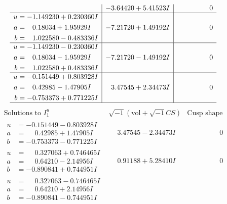 \documentclass[1p]{elsarticle_modified}
\theoremstyle{definition}
\newcommand{\I}{\sqrt{-1}}
\begin{document}
$$\begin{array}{c|c|c}
 & -3.64420 + 5.41523 I & \phantom{-0.000000 } 0 \\ \hline\begin{aligned}
u &= -1.149230 + 0.230360 I \\
a &= \phantom{-}0.18034 + 1.95929 I \\
b &= \phantom{-}1.022580 - 0.483336 I\end{aligned}
 & -7.21720 + 1.49192 I & \phantom{-0.000000 } 0 \\ \hline\begin{aligned}
u &= -1.149230 - 0.230360 I \\
a &= \phantom{-}0.18034 - 1.95929 I \\
b &= \phantom{-}1.022580 + 0.483336 I\end{aligned}
 & -7.21720 - 1.49192 I & \phantom{-0.000000 } 0 \\ \hline\begin{aligned}
u &= -0.151449 + 0.803928 I \\
a &= \phantom{-}0.42985 - 1.47905 I \\
b &= -0.753373 + 0.771225 I\end{aligned}
 & \phantom{-}3.47545 + 2.34473 I & \phantom{-0.000000 } 0\\
 \hline 
 \end{array}$$\newpage$$\begin{array}{c|c|c}  
\text{Solutions to }I^u_{1}& \I (\text{vol} + \sqrt{-1}CS) & \text{Cusp shape}\\
 \hline 
\begin{aligned}
u &= -0.151449 - 0.803928 I \\
a &= \phantom{-}0.42985 + 1.47905 I \\
b &= -0.753373 - 0.771225 I\end{aligned}
 & \phantom{-}3.47545 - 2.34473 I & \phantom{-0.000000 } 0 \\ \hline\begin{aligned}
u &= \phantom{-}0.327063 + 0.746465 I \\
a &= \phantom{-}0.64210 - 2.14956 I \\
b &= -0.890841 + 0.744951 I\end{aligned}
 & \phantom{-}0.91188 + 5.28410 I & \phantom{-0.000000 } 0 \\ \hline\begin{aligned}
u &= \phantom{-}0.327063 - 0.746465 I \\
a &= \phantom{-}0.64210 + 2.14956 I \\
b &= -0.890841 - 0.744951 I\end{aligned}

\end{array}$$
\end{document}
